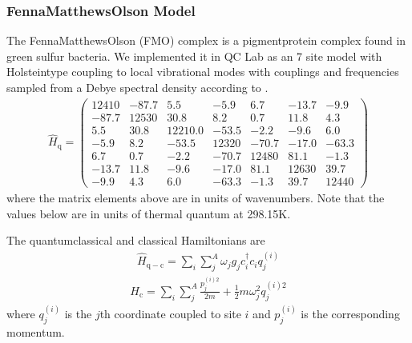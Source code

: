 \documentclass[letterpaper,10pt,english]{sphinxmanual}
\begin{document}
\subsubsection{Fenna\sphinxhyphen{}Matthews\sphinxhyphen{}Olson Model}
\label{\detokenize{user_guide/models/fmo_model:fenna-matthews-olson-model}}\label{\detokenize{user_guide/models/fmo_model:fmo-model}}\label{\detokenize{user_guide/models/fmo_model::doc}}
\sphinxAtStartPar
The Fenna\sphinxhyphen{}Matthews\sphinxhyphen{}Olson (FMO) complex is a pigment\sphinxhyphen{}protein complex found in green sulfur bacteria. We implemented it in QC Lab as an
7 site model with Holstein\sphinxhyphen{}type coupling to local vibrational modes with couplings and frequencies sampled from a Debye spectral
density according to .
\begin{equation*}
\begin{split}\hat{H}_{\mathrm{q}} = \begin{pmatrix}
    12410 & -87.7 & 5.5 & -5.9 & 6.7 & -13.7 & -9.9 \\
    -87.7 & 12530 & 30.8 & 8.2 & 0.7 & 11.8 & 4.3 \\
    5.5 & 30.8 & 12210.0 & -53.5 & -2.2 & -9.6 & 6.0 \\
    -5.9 & 8.2 & -53.5 & 12320 & -70.7 & -17.0 & -63.3 \\
    6.7 & 0.7 & -2.2 & -70.7 & 12480 & 81.1 & -1.3 \\
    -13.7 & 11.8 & -9.6 & -17.0 & 81.1 & 12630 & 39.7 \\
    -9.9 & 4.3 & 6.0 & -63.3 & -1.3 & 39.7 & 12440
\end{pmatrix}\end{split}
\end{equation*}
\sphinxAtStartPar
where the matrix elements above are in units of wavenumbers. Note that the values below are in units of thermal quantum at 298.15K.

\sphinxAtStartPar
The quantum\sphinxhyphen{}classical and classical Hamiltonians are
\begin{equation*}
\begin{split}\hat{H}_{\mathrm{q-c}} = \sum_{i}\sum_{j}^{A}\omega_{j}g_{j}c^{\dagger}_{i}c_{i}q_{j}^{(i)}\end{split}
\end{equation*}\begin{equation*}
\begin{split}H_{\mathrm{c}} = \sum_{i}\sum_{j}^{A} \frac{p_{j}^{(i)2}}{2m} + \frac{1}{2}m\omega_{j}^{2}q_{j}^{(i)2}\end{split}
\end{equation*}
\sphinxAtStartPar
where \(q^{(i)}_{j}\) is the \(j\)\sphinxhyphen{}th coordinate coupled to site \(i\) and \(p^{(i)}_{j}\) is the corresponding momentum.
\end{document}
